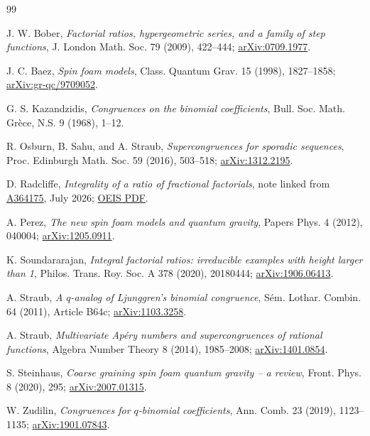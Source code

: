 \documentclass[11pt]{article}
\theoremstyle{definition}
\newcommand{\OEIS}[1]{\href{https://oeis.org/#1}{#1}}
\begin{document}
\begin{thebibliography}{99}

J. W. Bober,
\emph{Factorial ratios, hypergeometric series, and a family of step
functions}, J. London Math. Soc. 79 (2009), 422--444;
\href{https://arxiv.org/abs/0709.1977}{arXiv:0709.1977}.

J. C. Baez,
\emph{Spin foam models},
Class. Quantum Grav. 15 (1998), 1827--1858;
\href{https://arxiv.org/abs/gr-qc/9709052}{arXiv:gr-qc/9709052}.

G. S. Kazandzidis,
\emph{Congruences on the binomial coefficients},
Bull. Soc. Math. Gr\`ece, N.S. 9 (1968), 1--12.

R. Osburn, B. Sahu, and A. Straub,
\emph{Supercongruences for sporadic sequences},
Proc. Edinburgh Math. Soc. 59 (2016), 503--518;
\href{https://arxiv.org/abs/1312.2195}{arXiv:1312.2195}.

D. Radcliffe,
\emph{Integrality of a ratio of fractional factorials},
note linked from \OEIS{A364175}, July 2026;
\href{https://oeis.org/A364175/a364175.pdf}{OEIS PDF}.

A. Perez,
\emph{The new spin foam models and quantum gravity},
Papers Phys. 4 (2012), 040004;
\href{https://arxiv.org/abs/1205.0911}{arXiv:1205.0911}.

K. Soundararajan,
\emph{Integral factorial ratios: irreducible examples with height larger
than 1}, Philos. Trans. Roy. Soc. A 378 (2020), 20180444;
\href{https://arxiv.org/abs/1906.06413}{arXiv:1906.06413}.

A. Straub,
\emph{A $q$-analog of Ljunggren's binomial congruence},
S\'em. Lothar. Combin. 64 (2011), Article B64c;
\href{https://arxiv.org/abs/1103.3258}{arXiv:1103.3258}.

A. Straub,
\emph{Multivariate Ap\'ery numbers and supercongruences of rational
functions}, Algebra Number Theory 8 (2014), 1985--2008;
\href{https://arxiv.org/abs/1401.0854}{arXiv:1401.0854}.

S. Steinhaus,
\emph{Coarse graining spin foam quantum gravity -- a review},
Front. Phys. 8 (2020), 295;
\href{https://arxiv.org/abs/2007.01315}{arXiv:2007.01315}.

W. Zudilin,
\emph{Congruences for $q$-binomial coefficients},
Ann. Comb. 23 (2019), 1123--1135;
\href{https://arxiv.org/abs/1901.07843}{arXiv:1901.07843}.

\end{thebibliography}
\end{document}
